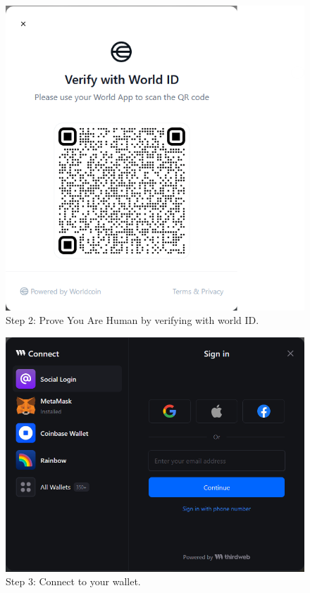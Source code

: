 \documentclass[conference]{IEEEtran}
\begin{document}
\begin{figure}[htbp]
    \centerline{\includegraphics[width=\linewidth]{./figures/verify.png}}
    \caption{Step 2: Prove You Are Human by verifying with world ID.}
    \label{fig:verify}
\end{figure}

\begin{figure}[htbp]
    \centerline{\includegraphics[width=\linewidth]{./figures/connect.png}}
    \caption{Step 3: Connect to your wallet.}
    \label{fig:connect}
\end{figure}
\end{document}

